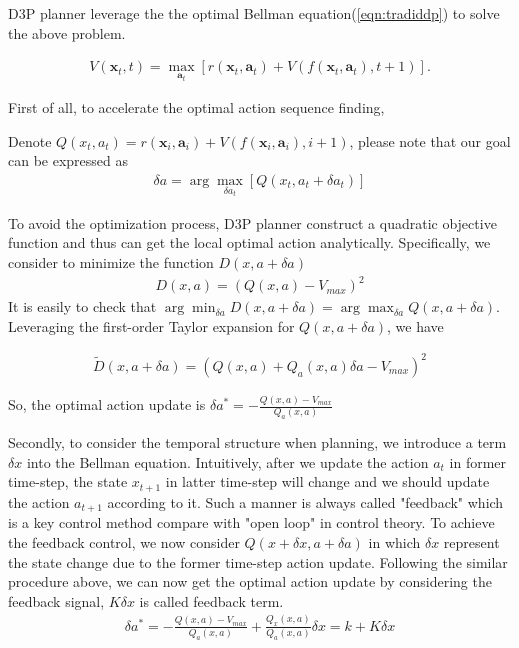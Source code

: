 \documentclass{article} %
\newcommand{\vmax}{V_{max}}
\begin{document}
D3P planner leverage the 
the optimal Bellman equation(\ref{eqn:tradiddp}) to solve the above problem.

\begin{align}
\label{eqn:tradiddp}
    V(\mathbf{x}_t, t) = \max_{\mathbf{a}_t}[r(\mathbf{x}_t, \mathbf{a}_t) + V(f(\mathbf{x}_t, \mathbf{a}_t), t+1)].
\end{align}

First of all, to accelerate the optimal action sequence finding,

Denote $Q(x_t, a_t) =  r(\mathbf{x}_i, \mathbf{a}_i) + V(f(\mathbf{x}_i, \mathbf{a}_i), i+1) $, please note that our goal can be expressed as 
\begin{align}
    \delta a = \arg\max_{\delta a_t}\left[ Q(x_t, a_t+\delta a_t) \right]
\end{align}

To avoid the optimization process, D3P planner construct a quadratic objective function and thus can get the local optimal action analytically. Specifically,  
we consider to minimize the function $D(x,a+\delta a)$
\begin{align}
    D(x,a) = \left( Q(x,a) -  \vmax \right)^2
\end{align}
It is easily to check that $\arg\min_{\delta a} D(x,a+\delta a) = \arg\max_{\delta a} Q(x,a + \delta a)$. Leveraging the first-order Taylor expansion for $Q(x,a+\delta a)$, we have 

\begin{align}
    \tilde{D}(x,a+\delta a) = (Q(x,a) + Q_a(x,a)\delta a - \vmax)^2
\end{align}



So, the optimal action update is $\delta a^* = -\frac{Q(x,a)- \vmax}{Q_a (x,a)}$

Secondly, to consider the temporal structure when planning, we introduce a term $\delta x$ into the Bellman equation. Intuitively, after we update the action $a_t$ in former time-step, the state $x_{t+1}$ in  latter time-step will change and we should update the action $a_{t+1}$ according to it. Such a manner is always called "feedback"  which is a key control method compare with "open loop" in control theory. To achieve the feedback control, we now consider  $Q(x+\delta x, a+\delta a)$ in which $\delta x$ represent the state change due to the former time-step action update.
Following the similar procedure above, we can now get the optimal action update by considering the feedback signal, $K\delta x$ is called feedback term. 
\begin{align}
    \delta a^* 
    = -\frac{Q(x,a)- \vmax}{Q_a (x,a)} + \frac{Q_x(x,a)}{Q_a(x,a)}\delta x = k + K\delta x 
\end{align} 
\end{document}
